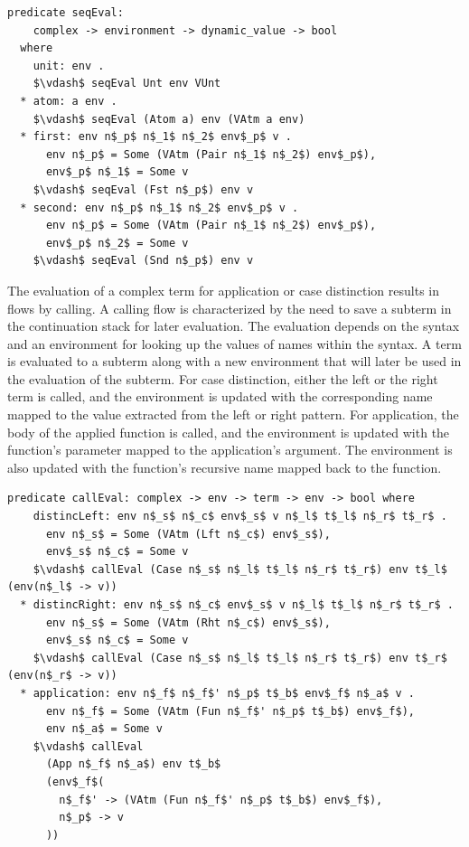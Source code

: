 \documentclass[letterpaper, 11pt]{extarticle}
\begin{document}
\begin{lstlisting}[language=logic, mathescape]
  predicate seqEval:
    complex -> environment -> dynamic_value -> bool 
  where
    unit: env . 
    $\vdash$ seqEval Unt env VUnt
  * atom: a env .
    $\vdash$ seqEval (Atom a) env (VAtm a env)
  * first: env n$_p$ n$_1$ n$_2$ env$_p$ v . 
      env n$_p$ = Some (VAtm (Pair n$_1$ n$_2$) env$_p$),
      env$_p$ n$_1$ = Some v
    $\vdash$ seqEval (Fst n$_p$) env v
  * second: env n$_p$ n$_1$ n$_2$ env$_p$ v . 
      env n$_p$ = Some (VAtm (Pair n$_1$ n$_2$) env$_p$), 
      env$_p$ n$_2$ = Some v 
    $\vdash$ seqEval (Snd n$_p$) env v
\end{lstlisting}

The evaluation of a complex term for application or case distinction 
results in flows by calling. A calling flow is characterized
by the need to save a subterm in the continuation stack for later evaluation.
The evaluation depends on the syntax
and an environment for looking up the values of names within the syntax.
A term is evaluated to a subterm along with a new environment that will
later be used in the evaluation of the subterm. For case distinction, either the left or the right
term is called, and the environment is updated with the corresponding name mapped to the
value extracted from the left or right pattern. For application, the body of the applied function 
is called, and the environment is updated with the function's parameter mapped to the
application's argument. The environment is also updated with the function's recursive name mapped back to
the function.

\begin{lstlisting}[language=logic, mathescape]
  predicate callEval: complex -> env -> term -> env -> bool where
    distincLeft: env n$_s$ n$_c$ env$_s$ v n$_l$ t$_l$ n$_r$ t$_r$ .
      env n$_s$ = Some (VAtm (Lft n$_c$) env$_s$),
      env$_s$ n$_c$ = Some v
    $\vdash$ callEval (Case n$_s$ n$_l$ t$_l$ n$_r$ t$_r$) env t$_l$ (env(n$_l$ -> v))
  * distincRight: env n$_s$ n$_c$ env$_s$ v n$_l$ t$_l$ n$_r$ t$_r$ .
      env n$_s$ = Some (VAtm (Rht n$_c$) env$_s$),
      env$_s$ n$_c$ = Some v
    $\vdash$ callEval (Case n$_s$ n$_l$ t$_l$ n$_r$ t$_r$) env t$_r$ (env(n$_r$ -> v))
  * application: env n$_f$ n$_f$' n$_p$ t$_b$ env$_f$ n$_a$ v .
      env n$_f$ = Some (VAtm (Fun n$_f$' n$_p$ t$_b$) env$_f$),
      env n$_a$ = Some v
    $\vdash$ callEval
      (App n$_f$ n$_a$) env t$_b$
      (env$_f$(
        n$_f$' -> (VAtm (Fun n$_f$' n$_p$ t$_b$) env$_f$),
        n$_p$ -> v
      ))
\end{lstlisting}
  
\end{document}
